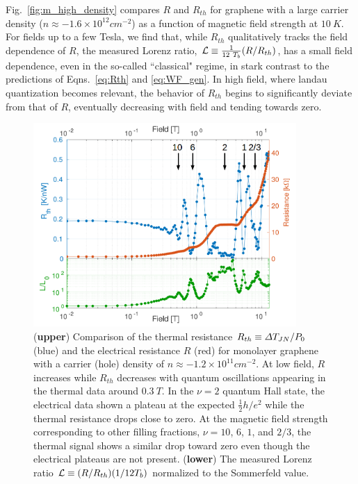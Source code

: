 Fig.~\ref{fig:m_high_density} compares $R$ and $R_{th}$ for graphene with a large carrier density ($n\approx -1.6\times10^{12}cm^{-2}$) as a function of magnetic field strength at $10~K$. For fields up to a few Tesla, we find that, while $R_{th}$ qualitatively tracks the field dependence of $R$, the measured Lorenz ratio, $\mathcal{L}\equiv \frac{1}{12~T_b} (R/R_{th})$, has a small field dependence, even in the so-called ``classical" regime, in stark contrast to the predictions of Eqns.~\ref{eq:Rth} and \ref{eq:WF_gen}. In high field, where landau quantization becomes relevant, the behavior of $R_{th}$ begins to significantly deviate from that of $R$, eventually decreasing with field and tending towards zero. 
\begin{figure}
\centering
\includegraphics[width=100mm]{figures/magneto/low_density.png}
\caption{(\textbf{upper}) Comparison of the thermal resistance $R_{th}\equiv \Delta T_{JN}/P_0$ (blue) and the electrical resistance $R$ (red) for monolayer graphene with a carrier (hole) density of $n\approx-1.2\times10^{11}cm^{-2}$. At low field, $R$ increases while $R_{th}$ decreases with quantum oscillations appearing in the thermal data around $0.3~T$. In the $\nu=2$ quantum Hall state, the electrical data shown a plateau at the expected $\frac{1}{2} h/e^2$ while the thermal resistance drops close to zero. At the magnetic field strength corresponding to other filling fractions, $\nu=10$, $6$, $1$, and $2/3$, the thermal signal shows a similar drop toward zero even though the electrical plateaus are not present. (\textbf{lower}) The measured Lorenz ratio $\mathcal{L} \equiv (R/R_{th})(1/12T_b)$ normalized to the Sommerfeld value.}
\label{fig:m_low_density}
\end{figure}
